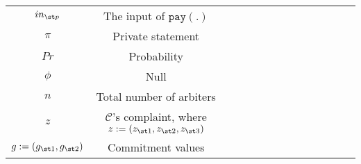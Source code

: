 \begin{table*}[!htbp]
\begin{scriptsize}
\begin{center}
{{\begin{tabular}{|c|c|c|c|c|c|c|c|c|c|c|c|c|c|}
 {    }\scriptsize$in_{\st p}$ & {    }\scriptsize The input of $\mathtt{pay}(.)$\\                    
%
 {   }\scriptsize$\pi$ & {   }\scriptsize Private statement\\        
   {    }\scriptsize$Pr$ & {    }\scriptsize Probability\\   

%
 {   }\scriptsize$\phi$ & {   }\scriptsize  Null\\ 
%
 {    }\scriptsize$n$ & {    }\scriptsize  Total number of arbiters\\  
%           
 {   }\scriptsize$z$ & {   }\scriptsize  $\mathcal{C}$'s complaint, where $z:=(z_{\st 1}, z_{\st 2}, z_{\st 3})$\\ 
%
 {    }\scriptsize $g:=(g_{\st 1}, g_{\st 2})$& {    }\scriptsize  Commitment values \\    
%

\hline 
                   
\end{tabular}\label{table:notation-table}
%
}}
\end{center}
\end{scriptsize}
\end{table*}






























